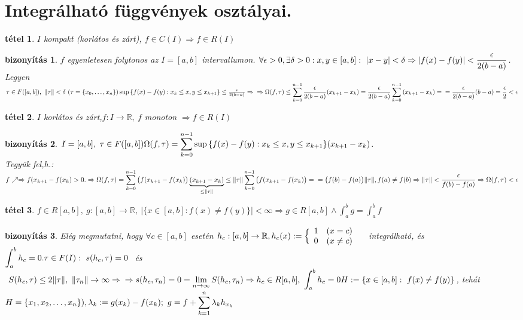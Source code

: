 \documentclass{article}
\newcommand{\la}{\lambda}
\newcommand{\R}{\mathbb{R}}
\newcommand{\n}{\rightarrow}
\newcommand{\nn}{\Rightarrow}
\newcommand{\di}{\displaystyle}
\theoremstyle{magyar}
\newtheorem{te}{tétel}[section]
\newtheorem{bi}{bizonyítás}[section]
\begin{document}
\section{Integrálható függvények osztályai.}
\begin{te}
  $I$ kompakt (korlátos és zárt), $f\in C(I)\nn f\in R(I)$
\end{te}
\begin{bi}
  $f$ egyenletesen folytonos az $I=[a,b]$ intervallumon. $\\
\forall\epsilon>0, \exists\delta>0: x,y\in[a,b]:~|x-y|<\delta\nn |f(x)-f(y)|<\di\frac{\epsilon}{2(b-a)}$.\\
 Legyen $\tau\in F([a,b]),~\Vert\tau\Vert<\delta~(\tau=\{x_0,\ldots,x_n\})\\
  \sup{\{f(x)-f(y):x_k\le x,y\le x_{k+1}\}}\le\frac{\epsilon}{2(b-a)}\nn\\
 \nn \Omega(f,\tau)\le\di\sum_{k=0}^{n-1}{\frac{\epsilon}{2(b-a)}(x_{k+1}-x_k)}=\frac{\epsilon}{2(b-a)}\sum_{k=0}^{n-1}{(x_{k+1}-x_k)}=\\=\frac{\epsilon}{2(b-a)}(b-a)=\frac{\epsilon}{2}<\epsilon$
\end{bi}
\begin{te}
  $I$ korlátos és zárt,$f:I\n\R,~f$ monoton $\nn f\in R(I)$
\end{te}
\begin{bi}
  $\di I=[a,b],~\tau\in{F([a,b])}\\
  \Omega(f,\tau)=\sum_{k=0}^{n-1}{\sup{\{f(x)-f(y):x_k\le x,y\le x_{k+1}\}(x_{k+1}-x_k)} }$.\\
   Tegyük fel,h.: $f\nearrow\nn f(x_{k+1}-f(x_k)>0.\\
   \nn\Omega(f,\tau)=\di\sum_{k=0}^{n-1}{\big(f(x_{k+1}-f(x_k)\big)\underbrace{(x_{k+1}-x_k)}_{\le\Vert\tau\Vert}}\le{\Vert\tau\Vert\sum_{k=0}^{n-1}{\big(f(x_{k+1}-f(x_k)\big)}}=\\
 =\big(f(b)-f(a)\big)\Vert\tau\Vert,\\
 f(a)\neq f(b)\nn\Vert\tau\Vert<\frac{\epsilon}{f(b)-f(a)}\nn\Omega(f,\tau)<\epsilon$
\end{bi}
\begin{te}
  $f\in R[a,b],~ g:[a,b]\n\R,~ \vert\{x\in[a,b]:f(x)\not=f(y)\}\vert<\infty\nn g\in R[a,b]\land\di\int_a^bg=\int_a^bf$
\end{te}
\begin{bi}
  Elég megmutatni, hogy $\forall c\in[a,b]$ esetén $h_c:[a,b]\n\R,\\h_c(x):=\Big\{
\begin{array}{lr}
  1& (x=c)\\
  0&(x\neq c)\\
\end{array}\quad$ integrálható, és $\di\int_a^bh_c=0.\\ 
  \tau\in{F(I)}:~ s(h_c,\tau)=0~$ és $\di~S(h_c,\tau)\le 2\Vert\tau\Vert,~\Vert\tau_n\Vert\n\infty
 \nn \\\nn s(h_c,\tau_n)=0=\lim_{n\n\infty}{S(h_c,\tau_n)}\nn h_c\in R[a,b],~\int_a^bh_c=0\\
  H:=\{x\in[a,b]:~ f(x)\not=f(y)\}$, tehát $H=\{x_1,x_2,\ldots,x_n\}),\\
  \la_k:=g(x_k)-f(x_k);~ g=f+\di\sum_{k=1}^n{\la_k{h_{x_k}}}$
\end{bi}
\end{document}

